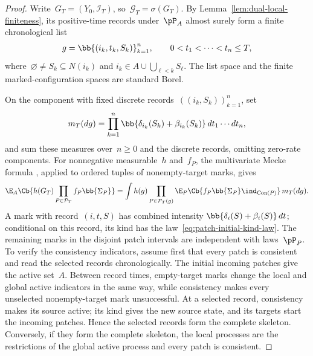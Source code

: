 \begin{proof}
Write~$G_T=(Y_0,\mathcal I_T)$, so~$\mathcal G_T=\sigma(G_T)$. By
Lemma~\ref{lem:dual-local-finiteness}, its positive-time records under~$\pP_A$
almost surely form a finite chronological list
\begin{equation*}
g=\bb{(i_k,t_k,S_k)}_{k=1}^n,
\qquad
0<t_1<\cdots<t_n\leq T,
\end{equation*}
where~$\varnothing\neq S_k\subseteq N(i_k)$ and
$i_k\in A\cup\bigcup_{\ell<k}S_\ell$.
The list space and the finite marked-configuration spaces are standard Borel.

On the component with fixed discrete records~$((i_k,S_k))_{k=1}^n$, set
\begin{equation*}
m_T(dg)
=
\prod_{k=1}^n
\bb{\delta_{i_k}(S_k)+\beta_{i_k}(S_k)}
\,dt_1\cdots dt_n,
\end{equation*}
and sum these measures over~$n\geq0$ and the discrete records, omitting
zero-rate components. For nonnegative measurable~$h$ and~$f_P$, the
multivariate Mecke formula
\cite[Theorem~4.4]{LastPenrose2017}, applied to ordered tuples of
nonempty-target marks, gives
\begin{equation*}
\E_A\Cb{
h(G_T)
\prod_{P\in\mathcal P_T}f_P\bb{\Sigma_P}
}
=
\int h(g)
\prod_{P\in\mathcal P_T(g)}
\E_P\Cb{
f_P\bb{\Sigma_P}\ind_{\operatorname{Con}(P)}
}
\,m_T(dg).
\end{equation*}
A mark with record~$(i,t,S)$ has combined intensity
$\bb{\delta_i(S)+\beta_i(S)}\,dt$; conditional on this record, its kind has
the law~\eqref{eq:patch-initial-kind-law}. The remaining marks in the disjoint
patch intervals are independent with laws~$\pP_P$. To verify the consistency
indicators, assume first that every patch is consistent and read the selected
records chronologically. The initial incoming patches give the active set~$A$.
Between record times, empty-target marks change the local and global active
indicators in the same way, while consistency makes every unselected
nonempty-target mark unsuccessful. At a selected record, consistency makes its
source active; its kind gives the new source state, and its targets start the
incoming patches. Hence the selected records form the complete skeleton.
Conversely, if they form the complete skeleton, the local processes are the
restrictions of the global active process and every patch is consistent.


\end{proof}
